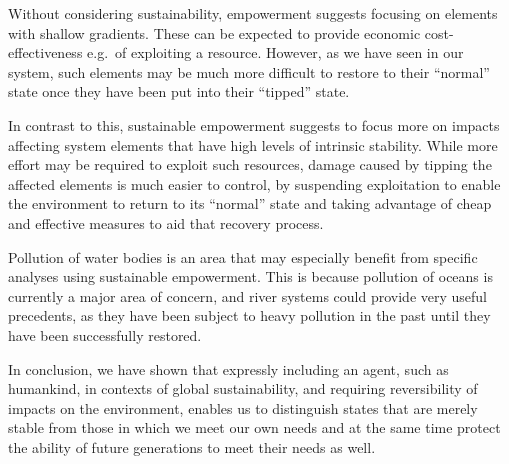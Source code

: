 \documentclass[conference]{IEEEtran}
\begin{document}
Without considering sustainability, empowerment suggests focusing on
elements with shallow gradients. These can be expected to provide
economic cost-effectiveness e.g.\ of exploiting a resource. However,
as we have seen in our system, such elements may be much more
difficult to restore to their ``normal'' state once they have been put
into their ``tipped'' state.

In contrast to this, sustainable empowerment suggests to focus more on
impacts affecting system elements that have high levels of intrinsic
stability. While more effort may be required to exploit such
resources, damage caused by tipping the affected elements is much
easier to control, by suspending exploitation to enable the
environment to return to its ``normal'' state and taking advantage of
cheap and effective measures to aid that recovery process.

Pollution of water bodies is an area that may especially benefit from
specific analyses using sustainable empowerment. This is because
pollution of oceans is currently a major area of concern, and river
systems could provide very useful precedents, as they have been
subject to heavy pollution in the past until they have been
successfully restored.

In conclusion, we have shown that expressly including an agent,
such as humankind, in contexts of global sustainability, and requiring
reversibility of impacts on the environment, enables us to distinguish
states that are merely stable from those in which we meet our own
needs and at the same time protect the ability of future generations
to meet their needs as well.


\end{document}
